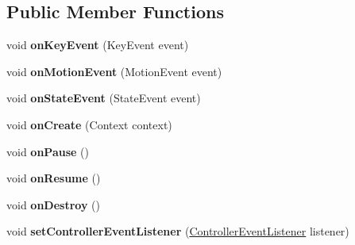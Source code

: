 \subsection*{Public Member Functions}
\begin{DoxyCompactItemize}
\item 
\mbox{\label{classorg_1_1cocos2dx_1_1lib_1_1GameControllerMoga_aa3c77017537261aa586c20dc5e7c651e}} 
void {\bfseries on\+Key\+Event} (Key\+Event event)
\item 
\mbox{\label{classorg_1_1cocos2dx_1_1lib_1_1GameControllerMoga_ad373034805e3be699aa48ba801c7fee8}} 
void {\bfseries on\+Motion\+Event} (Motion\+Event event)
\item 
\mbox{\label{classorg_1_1cocos2dx_1_1lib_1_1GameControllerMoga_af524d314304c0c86fbd119736bff9e2e}} 
void {\bfseries on\+State\+Event} (State\+Event event)
\item 
\mbox{\label{classorg_1_1cocos2dx_1_1lib_1_1GameControllerMoga_a0fcee240e8e1cc6e6fd5c93091a8eced}} 
void {\bfseries on\+Create} (Context context)
\item 
\mbox{\label{classorg_1_1cocos2dx_1_1lib_1_1GameControllerMoga_a1736a2f2f1bedcdbad4ac8ba16479e88}} 
void {\bfseries on\+Pause} ()
\item 
\mbox{\label{classorg_1_1cocos2dx_1_1lib_1_1GameControllerMoga_af5ae5615dfb6cd7e633c3465b4dc5afd}} 
void {\bfseries on\+Resume} ()
\item 
\mbox{\label{classorg_1_1cocos2dx_1_1lib_1_1GameControllerMoga_a739699e2b7d3d9848d14679a3e927ea9}} 
void {\bfseries on\+Destroy} ()
\item 
\mbox{\label{classorg_1_1cocos2dx_1_1lib_1_1GameControllerMoga_a20732182f0558413e840dbadccf5811a}} 
void {\bfseries set\+Controller\+Event\+Listener} (\hyperlink{interfaceorg_1_1cocos2dx_1_1lib_1_1GameControllerDelegate_1_1ControllerEventListener}{Controller\+Event\+Listener} listener)

\end{DoxyCompactItemize}
